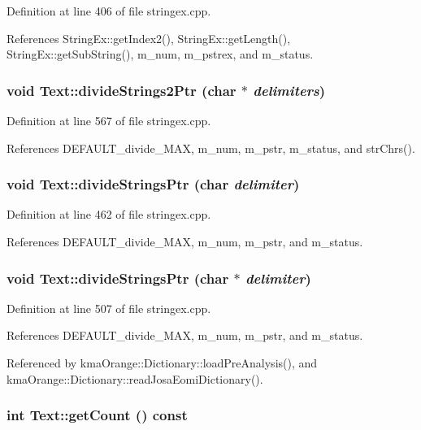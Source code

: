 Definition at line 406 of file stringex.cpp.

References StringEx::getIndex2(), StringEx::getLength(), StringEx::getSubString(), m\_\-num, m\_\-pstrex, and m\_\-status.\hypertarget{classText_b7ef1700c05efefe44eda7961d06f017}{
\subsubsection[{divideStrings2Ptr}]{\setlength{\rightskip}{0pt plus 5cm}void Text::divideStrings2Ptr (char $\ast$ {\em delimiters})}}
\label{classText_b7ef1700c05efefe44eda7961d06f017}




Definition at line 567 of file stringex.cpp.

References DEFAULT\_\-divide\_\-MAX, m\_\-num, m\_\-pstr, m\_\-status, and strChrs().\hypertarget{classText_f9b3e13192f2c151cb47ca6522f8bb26}{
\subsubsection[{divideStringsPtr}]{\setlength{\rightskip}{0pt plus 5cm}void Text::divideStringsPtr (char {\em delimiter})}}
\label{classText_f9b3e13192f2c151cb47ca6522f8bb26}




Definition at line 462 of file stringex.cpp.

References DEFAULT\_\-divide\_\-MAX, m\_\-num, m\_\-pstr, and m\_\-status.\hypertarget{classText_218720737506b3278d080ba4198d0f86}{
\subsubsection[{divideStringsPtr}]{\setlength{\rightskip}{0pt plus 5cm}void Text::divideStringsPtr (char $\ast$ {\em delimiter})}}
\label{classText_218720737506b3278d080ba4198d0f86}




Definition at line 507 of file stringex.cpp.

References DEFAULT\_\-divide\_\-MAX, m\_\-num, m\_\-pstr, and m\_\-status.

Referenced by kmaOrange::Dictionary::loadPreAnalysis(), and kmaOrange::Dictionary::readJosaEomiDictionary().\hypertarget{classText_677230c4f58f15cff7b014a91492e10b}{
\subsubsection[{getCount}]{\setlength{\rightskip}{0pt plus 5cm}int Text::getCount () const}}
\label{classText_677230c4f58f15cff7b014a91492e10b}




